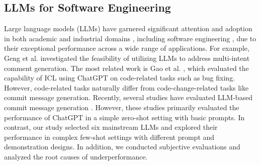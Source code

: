 \subsection{LLMs for Software Engineering}
Large language models (LLMs) have garnered significant attention and adoption in both academic and industrial domains \cite{zhao2023survey}, including software engineering \cite{hou2023large, fan2023large}, due to their exceptional performance across a wide range of applications. 
For example, Geng et al. \cite{geng2024large} investigated the feasibility of utilizing LLMs to address multi-intent comment generation.
The most related work is Gao et al. \cite{gao2023makes}, which evaluated the capability of ICL using ChatGPT on code-related tasks such as bug fixing. However, code-related tasks naturally differ from code-change-related tasks like commit message generation.
Recently, several studies have evaluated LLM-based commit message generation \cite{eliseeva2023commit, tao2024kadel, zhang2024using, lopes2024commit, zhang2024automatic, wu2024commit}.
However, these studies primarily evaluated the performance of ChatGPT in a simple zero-shot setting with basic prompts. In contrast, our study selected six mainstream LLMs and explored their performance in complex few-shot settings with different prompt and demonstration designs. In addition, we conducted subjective evaluations and analyzed the root causes of underperformance.